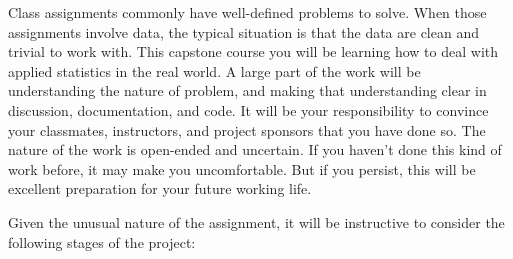 \documentclass[11pt, oneside]{article}   	%
\begin{document}
Class assignments commonly have well-defined problems to solve.  When those
assignments involve data, the typical situation is that the data are clean and
trivial to work with.  This capstone course you will be learning how to deal
with applied statistics in the real world.  A large part of the work will be
understanding the nature of problem, and making that understanding clear in
discussion, documentation, and code.  It will be your responsibility to
convince your classmates, instructors, and project sponsors that you have done
so.  The nature of the work is open-ended and uncertain.  If you haven't done
this kind of work before, it may make you uncomfortable.  But if you persist,
this will be excellent preparation for your future working life.

Given the unusual nature of the assignment, it will be instructive to consider
the following stages of the project:
\end{document}
